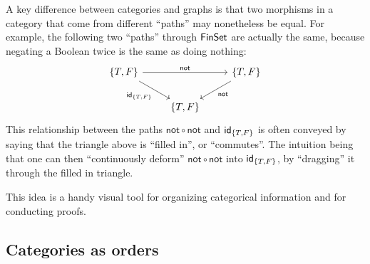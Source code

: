 A key difference between categories and graphs is that
two morphisms in a category that come from
different ``paths'' may nonetheless be equal.
For example, the following two ``paths'' through \(\mathsf{FinSet}\)
are actually the same, because negating a Boolean twice is the same as doing nothing:
\[%
\begin{tikzcd}
{\{T,F\}} \arrow[rr, "\mathsf{not}"] \arrow[rd, "{\idt_{\{T,F\}}}"'] &           & {\{T,F\}} \arrow[ld, "\mathsf{not}"] \\
                                                                     & {\{T,F\}} &
\end{tikzcd}\]
This relationship between the paths \(\mathsf{not}\circ \mathsf{not}\) and \(\mathsf{id}_{\{T,F\}}\)
is often conveyed by saying that the triangle above is ``filled in'', or ``commutes''.
The intuition being that one can then ``continuously deform''
\(\mathsf{not}\circ\mathsf{not}\) into \(\mathsf{id}_{\{T,F\}}\),
by ``dragging'' it through the filled in triangle.

This idea is a handy visual tool for organizing categorical information
and for conducting proofs.

\subsection{Categories as orders}

